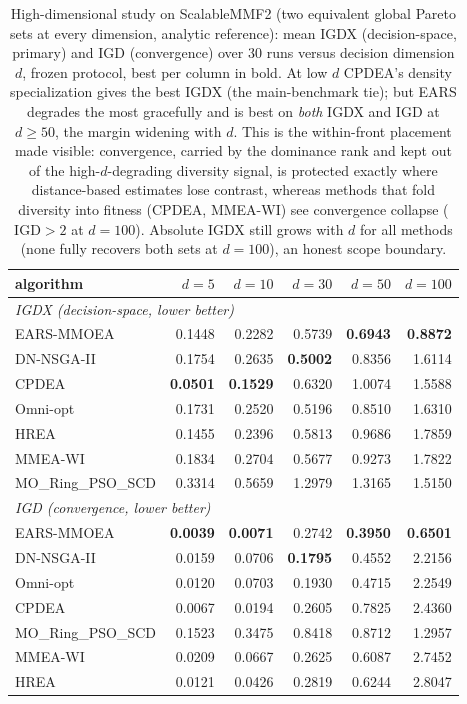 \begin{table}[t]
\centering\small
\caption{High-dimensional study on ScalableMMF2 (two equivalent global Pareto sets at every dimension, analytic reference): mean IGDX (decision-space, primary) and IGD (convergence) over $30$ runs versus decision dimension $d$, frozen protocol, best per column in bold. At low $d$ CPDEA's density specialization gives the best IGDX (the main-benchmark tie); but EARS degrades the most gracefully and is best on \emph{both} IGDX and IGD at $d\!\ge\!50$, the margin widening with $d$. This is the within-front placement made visible: convergence, carried by the dominance rank and kept out of the high-$d$-degrading diversity signal, is protected exactly where distance-based estimates lose contrast, whereas methods that fold diversity into fitness (CPDEA, MMEA-WI) see convergence collapse ($\mathrm{IGD}\!>\!2$ at $d{=}100$). Absolute IGDX still grows with $d$ for all methods (none fully recovers both sets at $d{=}100$), an honest scope boundary.}
\label{tab:highdim}
\begin{tabular}{lrrrrr}
\toprule
algorithm & $d{=}5$ & $d{=}10$ & $d{=}30$ & $d{=}50$ & $d{=}100$ \\
\midrule
\multicolumn{6}{l}{\emph{IGDX (decision-space, lower better)}}\\
EARS-MMOEA & 0.1448 & 0.2282 & 0.5739 & \textbf{0.6943} & \textbf{0.8872} \\
DN-NSGA-II & 0.1754 & 0.2635 & \textbf{0.5002} & 0.8356 & 1.6114 \\
CPDEA & \textbf{0.0501} & \textbf{0.1529} & 0.6320 & 1.0074 & 1.5588 \\
Omni-opt & 0.1731 & 0.2520 & 0.5196 & 0.8510 & 1.6310 \\
HREA & 0.1455 & 0.2396 & 0.5813 & 0.9686 & 1.7859 \\
MMEA-WI & 0.1834 & 0.2704 & 0.5677 & 0.9273 & 1.7822 \\
MO\_Ring\_PSO\_SCD & 0.3314 & 0.5659 & 1.2979 & 1.3165 & 1.5150 \\
\midrule
\multicolumn{6}{l}{\emph{IGD (convergence, lower better)}}\\
EARS-MMOEA & \textbf{0.0039} & \textbf{0.0071} & 0.2742 & \textbf{0.3950} & \textbf{0.6501} \\
DN-NSGA-II & 0.0159 & 0.0706 & \textbf{0.1795} & 0.4552 & 2.2156 \\
Omni-opt & 0.0120 & 0.0703 & 0.1930 & 0.4715 & 2.2549 \\
CPDEA & 0.0067 & 0.0194 & 0.2605 & 0.7825 & 2.4360 \\
MO\_Ring\_PSO\_SCD & 0.1523 & 0.3475 & 0.8418 & 0.8712 & 1.2957 \\
MMEA-WI & 0.0209 & 0.0667 & 0.2625 & 0.6087 & 2.7452 \\
HREA & 0.0121 & 0.0426 & 0.2819 & 0.6244 & 2.8047 \\
\bottomrule
\end{tabular}
\end{table}
